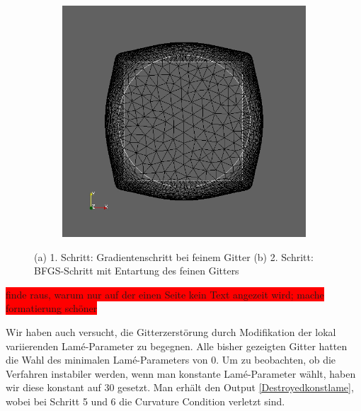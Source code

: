 \begin{figure}
\begin{subfigure}{0.5\textwidth}
	\includegraphics[scale=0.25]{pic_smallcircle_bfgsdestroyed2.jpg}
	\caption{}	
	\end{subfigure}
\caption{(a) 1. Schritt: Gradientenschritt bei feinem Gitter (b) 2. Schritt: BFGS-Schritt mit Entartung des feinen Gitters}
\label{Destroyedbfgs}
\end{figure}

\colorbox{red}{finde raus, warum nur auf der einen Seite kein Text angezeit wird; mache formatierung schöner}

Wir haben auch versucht, die Gitterzerstörung durch Modifikation der lokal variierenden Lamé-Parameter zu begegnen. Alle bisher gezeigten Gitter hatten die Wahl des minimalen Lamé-Parameters von 0. Um zu beobachten, ob die Verfahren instabiler werden, wenn man konstante Lamé-Parameter wählt, haben wir diese konstant auf 30 gesetzt. Man erhält den Output \ref{Destroyedkonstlame}, wobei bei Schritt 5 und 6 die Curvature Condition verletzt sind.

